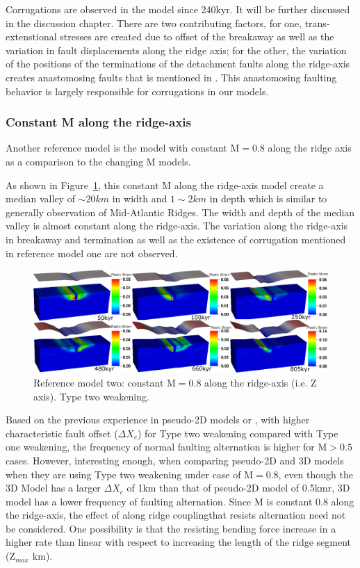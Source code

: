 Corrugations are observed in the model since 240kyr. It will be further discussed in the discussion chapter. There are two contributing factors, for one, trans-extenstional stresses are created due to offset of the breakaway as well as the variation in fault displacements along the ridge axis; for the other, the variation of the positions of the terminations of the detachment faults along the ridge-axis creates anastomosing faults that is mentioned in \citep{Smith2014}. This anastomosing faulting behavior is largely responsible for corrugations in our models.      

\subsubsection{Constant M along the ridge-axis }
Another reference model is the model with constant M$=0.8$ along the ridge axis as a comparison to the changing M models.

As shown in Figure~\hyperref[fig_Results1_3]{\ref{fig_Results1_3}}, this constant M along the ridge-axis model create a median valley of $\sim 20km$ in width and $1\sim2km$ in depth which is similar to generally observation of Mid-Atlantic Ridges. The width and depth of the median valley is almost constant along the ridge-axis. The variation along the ridge-axis in breakaway and termination as well as the existence of corrugation mentioned in reference model one are not observed. 
\begin{figure}[hc]
  \centering
    \includegraphics[width=1.0\textwidth]{fig_Results1_3.eps}
  \caption{Reference model two: constant M$=0.8$ along the ridge-axis (i.e. Z axis). Type two weakening.}
 \label{fig_Results1_3}
\end{figure}   

Based on the previous experience in pseudo-2D models or \citep{Lavier2000}, with higher characteristic fault offset ($\Delta X_{c}$) for Type two weakening compared with Type one weakening, the frequency of normal faulting alternation is higher for M$>0.5$ cases. However, interesting enough, when comparing pseudo-2D and 3D models when they are using Type two weakening under case of M$=0.8$, even though the 3D Model has a larger $\Delta X_{c}$ of 1km than that of pseudo-2D model of 0.5kmr, 3D model has a lower frequency of faulting alternation. Since M is constant 0.8 along the ridge-axis, the effect of along ridge couplingthat resists alternation need not be considered. One possibility is that the resisting bending force increase in a higher rate than linear with respect to increasing the length of the ridge segment (Z$_{max}$ km).  

